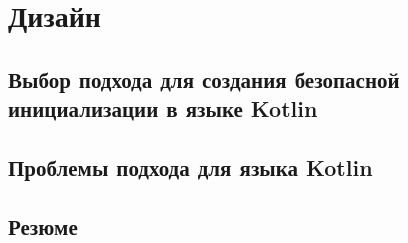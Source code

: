 \chapter{Дизайн}\label{ch:дизайн-}


\section{Выбор подхода для создания безопасной инициализации в языке Kotlin}
\label{sec:выбор-подхода-для-создания-безопасной-инициализации-в-языке-kotlin}



\section{Проблемы подхода для языка Kotlin}\label{sec:проблемы-подхода-для-языка-kotlin}



\section{Резюме}\label{sec:резюме-}

